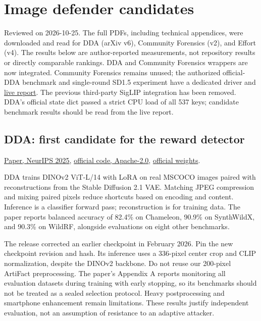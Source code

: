 \section{Image defender
candidates}\label{record-docs-image-defenders-md-image-defender-candidates}

Reviewed on 2026-10-25. The full PDFs, including technical appendices,
were downloaded and read for DDA (arXiv v6), Community Forensics (v2),
and Effort (v4). The results below are author-reported measurements, not
repository results or directly comparable rankings. DDA and Community
Forensics wrappers are now integrated. Community Forensics remains
unused; the authorized official-DDA benchmark and single-round SD1.5
experiment have a dedicated driver and
\href{records/docs/image_results.tex}{live report}. The previous
third-party SigLIP integration has been removed. DDA's official state
dict passed a strict CPU load of all 537 keys; candidate benchmark
results should be read from the live report.

\subsection{DDA: first candidate for the reward
detector}\label{record-docs-image-defenders-md-dda-first-candidate-for-the-reward-detector}

\href{https://arxiv.org/pdf/2505.14359v6}{Paper, NeurIPS 2025},
\href{https://github.com/roy-ch/Dual-Data-Alignment}{official code,
Apache-2.0},
\href{https://huggingface.co/Junwei-Xi/Dual-Data-Alignment}{official
weights}.

DDA trains DINOv2 ViT-L/14 with LoRA on real MSCOCO images paired with
reconstructions from the Stable Diffusion 2.1 VAE. Matching JPEG
compression and mixing paired pixels reduce shortcuts based on encoding
and content. Inference is a classifier forward pass; reconstruction is
for training data. The paper reports balanced accuracy of 82.4\% on
Chameleon, 90.9\% on SynthWildX, and 90.3\% on WildRF, alongside
evaluations on eight other benchmarks.

The release corrected an earlier checkpoint in February 2026. Pin the
new checkpoint revision and hash. Its inference uses a 336-pixel center
crop and CLIP normalization, despite the DINOv2 backbone. Do not reuse
our 200-pixel ArtiFact preprocessing. The paper's Appendix A reports
monitoring all evaluation datasets during training with early stopping,
so its benchmarks should not be treated as a sealed selection protocol.
Heavy postprocessing and smartphone enhancement remain limitations.
These results justify independent evaluation, not an assumption of
resistance to an adaptive attacker.

